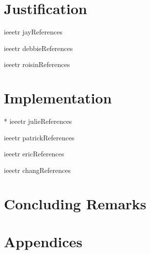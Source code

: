 \documentclass[10pt]{book} %
\begin{document}


\chapter{Justification}


{ieeetr}
{jay}{References}
\clearpage


{ieeetr}
{debbie}{References}
\clearpage


{ieeetr}
{roisin}{References}
\clearpage

\chapter{Implementation}


\nocite{julie}{*}
{ieeetr}
{julie}{References}
\clearpage


{ieeetr}
{patrick}{References}
\clearpage


{ieeetr}
{eric}{References}
\clearpage


{ieeetr}
{chang}{References}
\clearpage

\chapter{Concluding Remarks}

\chapter*{Appendices}


%
%
\end{document}
